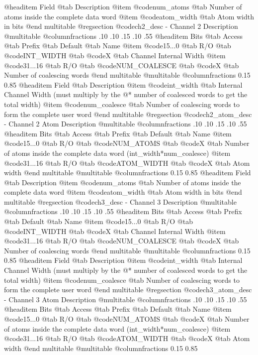 @headitem Field @tab Description
@item @code{num_atoms} @tab Number of atoms inside the complete data word
@item @code{atom_width} @tab Atom width in bits
@end multitable
@regsection @code{ch2_desc} - Channel 2 Description
@multitable @columnfractions .10 .10 .15 .10 .55
@headitem Bits @tab Access @tab Prefix @tab Default @tab Name
@item @code{15...0}
@tab R/O @tab
@code{INT_WIDTH}
@tab @code{X} @tab 
Channel Internal Width
@item @code{31...16}
@tab R/O @tab
@code{NUM_COALESCE}
@tab @code{X} @tab 
Number of coalescing words
@end multitable
@multitable @columnfractions 0.15 0.85
@headitem Field @tab Description
@item @code{int_width} @tab Internal Channel Width (must multiply by the @* number of coalesced words to get the total width)
@item @code{num_coalesce} @tab Number of coalescing words to form the complete user word
@end multitable
@regsection @code{ch2_atom_desc} - Channel 2 Atom Description
@multitable @columnfractions .10 .10 .15 .10 .55
@headitem Bits @tab Access @tab Prefix @tab Default @tab Name
@item @code{15...0}
@tab R/O @tab
@code{NUM_ATOMS}
@tab @code{X} @tab 
Number of atoms inside the complete data word (int_width*num_coalesce)
@item @code{31...16}
@tab R/O @tab
@code{ATOM_WIDTH}
@tab @code{X} @tab 
Atom width
@end multitable
@multitable @columnfractions 0.15 0.85
@headitem Field @tab Description
@item @code{num_atoms} @tab Number of atoms inside the complete data word
@item @code{atom_width} @tab Atom width in bits
@end multitable
@regsection @code{ch3_desc} - Channel 3 Description
@multitable @columnfractions .10 .10 .15 .10 .55
@headitem Bits @tab Access @tab Prefix @tab Default @tab Name
@item @code{15...0}
@tab R/O @tab
@code{INT_WIDTH}
@tab @code{X} @tab 
Channel Internal Width
@item @code{31...16}
@tab R/O @tab
@code{NUM_COALESCE}
@tab @code{X} @tab 
Number of coalescing words
@end multitable
@multitable @columnfractions 0.15 0.85
@headitem Field @tab Description
@item @code{int_width} @tab Internal Channel Width (must multiply by the @* number of coalesced words to get the total width)
@item @code{num_coalesce} @tab Number of coalescing words to form the complete user word
@end multitable
@regsection @code{ch3_atom_desc} - Channel 3 Atom Description
@multitable @columnfractions .10 .10 .15 .10 .55
@headitem Bits @tab Access @tab Prefix @tab Default @tab Name
@item @code{15...0}
@tab R/O @tab
@code{NUM_ATOMS}
@tab @code{X} @tab 
Number of atoms inside the complete data word (int_width*num_coalesce)
@item @code{31...16}
@tab R/O @tab
@code{ATOM_WIDTH}
@tab @code{X} @tab 
Atom width
@end multitable
@multitable @columnfractions 0.15 0.85
